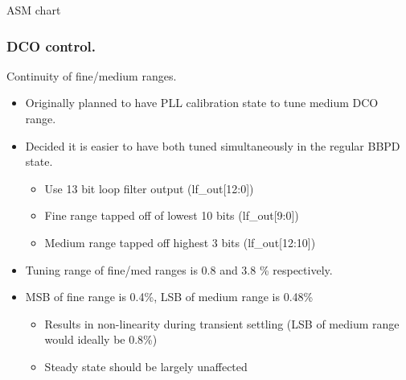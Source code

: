 \documentclass[t, screen, aspectratio=43]{beamer}
\begin{document}
\begin{frame}
\begin{block}{ASM chart}
\begin{minipage}{7cm}
\begin{figure}[htb!]
			\end{figure}


		\end{minipage}%

	\end{block}	
\end{frame}


\begin{frame}
	\frametitle{DCO control.}
	\begin{block}{Continuity of fine/medium ranges.}
			\vspace{1em}
			\tiny
			\begin{itemize}[itemsep=4pt,label=\protect---]
			        \item Originally planned to have PLL calibration state to tune medium DCO range.
			        \item Decided it is easier to have both tuned simultaneously in the regular BBPD state.
					\begin{itemize}[itemsep=4pt,label=$\bullet$]
						\item Use 13 bit loop filter output (lf\_out[12:0])
						\item Fine range tapped off of lowest 10 bits (lf\_out[9:0])
						\item Medium range tapped off highest 3 bits (lf\_out[12:10])
					\end{itemize}
					\item Tuning range of fine/med ranges is 0.8 and 3.8 \% respectively.
					\item MSB of fine range is 0.4\%, LSB of medium range is 0.48\%
					\begin{itemize}[itemsep=4pt,label=$\bullet$]
						\item Results in non-linearity during transient settling (LSB of medium range would ideally be 0.8\%)
						\item Steady state should be largely unaffected
					\end{itemize}
			\end{itemize}


	\end{block}	
\end{frame}
\end{document}
